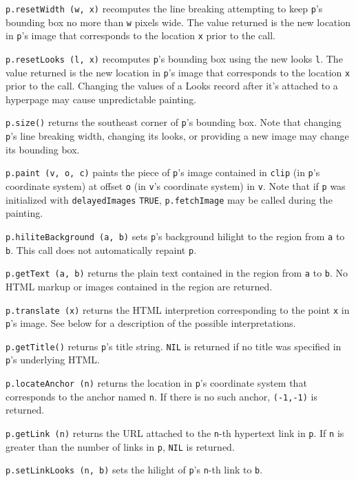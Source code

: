 {{   {\tt p.resetWidth (w, x)} recomputes the line breaking attempting to keep
   {\tt p}'s bounding box no more than {\tt w} pixels wide.  The value returned
   is the new location in {\tt p}'s image that corresponds to the location {\tt x}
   prior to the call.
\par
   {\tt p.resetLooks (l, x)} recomputes {\tt p}'s bounding box using the new looks
   {\tt l}.  The value returned is the new location in {\tt p}'s image that
   corresponds to the location {\tt x} prior to the call.  Changing the values
   of a Looks record after it's attached to a hyperpage may cause
   unpredictable painting.
\par
   {\tt p.size()} returns the southeast corner of {\tt p}'s bounding box.  Note
   that changing {\tt p}'s line breaking width, changing its looks, or
   providing a new image may change its bounding box.
\par
   {\tt p.paint (v, o, c)} paints the piece of {\tt p}'s image contained
   in {\tt clip} (in {\tt p}'s coordinate system) at offset {\tt o} (in {\tt v}'s
   coordinate system) in {\tt v}.  Note that if {\tt p} was initialized with
   {\tt delayedImages} {\tt TRUE}, {\tt p.fetchImage} may be called during the
   painting.
\par
   {\tt p.hiliteBackground (a, b)} sets {\tt p}'s background hilight to the region
   from {\tt a} to {\tt b}.  This call does not automatically repaint {\tt p}.
\par
   {\tt p.getText (a, b)} returns the plain text contained in the region from
   {\tt a} to {\tt b}.  No HTML markup or images contained in the region are
   returned.
\par
   {\tt p.translate (x)} returns the HTML interpretion corresponding to the
   point {\tt x} in {\tt p}'s image.  See below for a description of the possible
   interpretations.
\par
   {\tt p.getTitle()} returns {\tt p}'s title string.   {\tt NIL} is returned if no
   title was specified in {\tt p}'s underlying HTML.
   \par
   {\tt p.locateAnchor (n)} returns the location in {\tt p}'s coordinate system
   that corresponds to the anchor named {\tt n}.  If there is no such anchor,
   {\tt (-1,-1)} is returned.
\par
   {\tt p.getLink (n)} returns the URL attached to the {\tt n}-th hypertext link
   in {\tt p}.  If {\tt n} is greater than the number of links in {\tt p}, {\tt NIL} is
   returned.
\par
   {\tt p.setLinkLooks (n, b)} sets the hilight of {\tt p}'s {\tt n}-th link to {\tt b}.
}}
